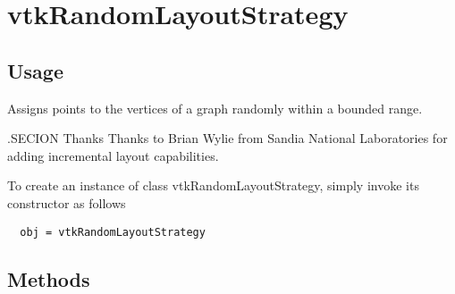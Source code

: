 \section{vtkRandomLayoutStrategy}

\subsection{Usage}

 Assigns points to the vertices of a graph randomly within a bounded range.

 .SECION Thanks
 Thanks to Brian Wylie from Sandia National Laboratories for adding incremental
 layout capabilities.

To create an instance of class vtkRandomLayoutStrategy, simply
invoke its constructor as follows
\begin{verbatim}
  obj = vtkRandomLayoutStrategy
\end{verbatim}
\subsection{Methods}

